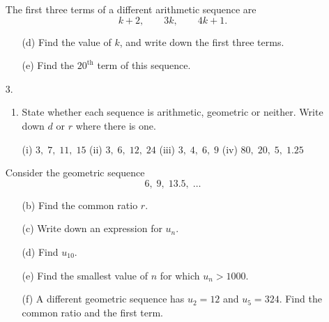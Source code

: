\documentclass[12pt, twoside]{article}
\begin{document}
\begin{enumerate}[itemsep=0.15cm]
The first three terms of a different arithmetic sequence are
$$k + 2, \qquad 3k, \qquad 4k + 1.$$

\begin{enumerate}[itemsep=0.1cm]
  \item[(d)] Find the value of $k$, and write down the first three terms.
  \item[(e)] Find the $20^{\text{th}}$ term of this sequence.
\end{enumerate}


\newpage

\item[3.]

\begin{enumerate}[itemsep=0.1cm]
  \item State whether each sequence is arithmetic, geometric or neither.
  Write down $d$ or $r$ where there is one.

  \hspace*{1em} (i) $3,\; 7,\; 11,\; 15$ \hfill (ii) $3,\; 6,\; 12,\; 24$
  \hfill (iii) $3,\; 4,\; 6,\; 9$ \hfill (iv) $80,\; 20,\; 5,\; 1.25$
  \hspace*{1em}
\end{enumerate}

Consider the geometric sequence
$$6,\; 9,\; 13.5,\; \ldots$$

\begin{enumerate}[itemsep=0.1cm]
  \item[(b)] Find the common ratio $r$.
  \item[(c)] Write down an expression for $u_{n}$.
  \item[(d)] Find $u_{10}$.
  \item[(e)] Find the smallest value of $n$ for which $u_{n} > 1000$.
  \item[(f)] A different geometric sequence has $u_{2} = 12$ and
  $u_{5} = 324$. Find the common ratio and the first term.
\end{enumerate}



\end{enumerate}
\end{document}
